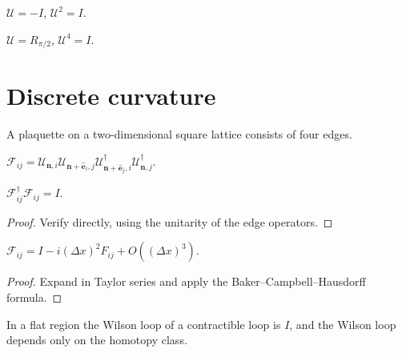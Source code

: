 \begin{example}\label{ex:lattice_c2}
$\mathcal{U}=-I$, $\mathcal{U}^2=I$.
\end{example}

\begin{example}\label{ex:lattice_c4}
$\mathcal{U}=R_{\pi/2}$, $\mathcal{U}^4=I$.
\end{example}

\section{Discrete curvature}\label{sec:discrete_curvature}

\begin{definition}\label{def:plaquette}
A plaquette on a two-dimensional square lattice consists of four edges.
\end{definition}

\begin{definition}\label{def:discrete_curvature}
$\mathcal{F}_{ij}=\mathcal{U}_{\mathbf{n},i}\mathcal{U}_{\mathbf{n}+\hat{\mathbf{e}}_i,j}\mathcal{U}_{\mathbf{n}+\hat{\mathbf{e}}_j,i}^\dagger\mathcal{U}_{\mathbf{n},j}^\dagger$.
\end{definition}

\begin{proposition}\label{prop:wilson_unitary}
$\mathcal{F}_{ij}^\dagger\mathcal{F}_{ij}=I$.
\end{proposition}

\begin{proof}
Verify directly, using the unitarity of the edge operators.
\end{proof}

\begin{proposition}\label{prop:discrete_continuous_curvature}
$\mathcal{F}_{ij}=I-i(\Delta x)^2F_{ij}+O((\Delta x)^3)$.
\end{proposition}

\begin{proof}
Expand in Taylor series and apply the Baker--Campbell--Hausdorff formula.
\end{proof}

\begin{lemma}\label{ch12_wilson_homotopy_lemma}
In a flat region the Wilson loop of a contractible loop is $I$, and the Wilson loop depends only on the homotopy class.
\end{lemma}

